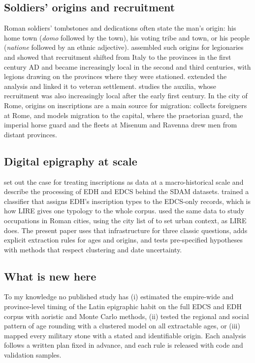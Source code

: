 \subsection{Soldiers' origins and recruitment}
Roman soldiers' tombstones and dedications often state the man's origin: his home town (\textit{domo} followed by the town), his voting tribe and town, or his people (\textit{natione} followed by an ethnic adjective). \citet{forni1953} assembled such origins for legionaries and showed that recruitment shifted from Italy to the provinces in the first century AD and became increasingly local in the second and third centuries, with legions drawing on the provinces where they were stationed. \citet{mann1983} extended the analysis and linked it to veteran settlement. \citet{haynes2013} studies the auxilia, whose recruitment was also increasingly local after the early first century. In the city of Rome, origins on inscriptions are a main source for migration: \citet{noy2000} collects foreigners at Rome, and \citet{tacoma2016} models migration to the capital, where the praetorian guard, the imperial horse guard and the fleets at Misenum and Ravenna drew men from distant provinces.

\subsection{Digital epigraphy at scale}
\citet{hermankova2021} set out the case for treating inscriptions as data at a macro-historical scale and describe the processing of EDH and EDCS behind the SDAM datasets. \citet{kase2021classifying} trained a classifier that assigns EDH's inscription types to the EDCS-only records, which is how LIRE gives one typology to the whole corpus. \citet{kase2022division} used the same data to study occupations in Roman cities, using the city list of \citet{hanson2016} to set urban context, as LIRE does. The present paper uses that infrastructure for three classic questions, adds explicit extraction rules for ages and origins, and tests pre-specified hypotheses with methods that respect clustering and date uncertainty.

\subsection{What is new here}
To my knowledge no published study has (i) estimated the empire-wide and province-level timing of the Latin epigraphic habit on the full EDCS and EDH corpus with aoristic and Monte Carlo methods, (ii) tested the regional and social pattern of age rounding with a clustered model on all extractable ages, or (iii) mapped every military stone with a stated and identifiable origin. Each analysis follows a written plan fixed in advance, and each rule is released with code and validation samples.

